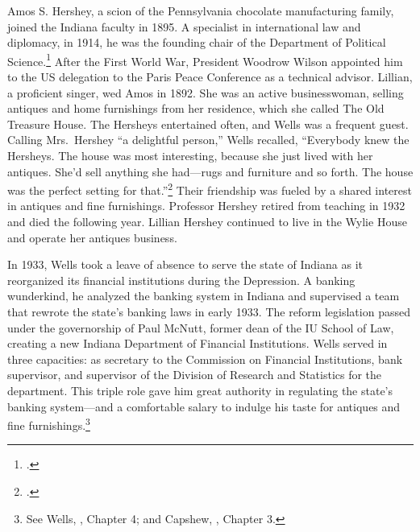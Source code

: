 \documentclass[
  american,
  letterpaper,
]{scrreprt}
\begin{document}
Amos S. Hershey, a scion of the Pennsylvania chocolate manufacturing
family, joined the Indiana faculty in 1895. A specialist in
international law and diplomacy, in 1914, he was the founding chair of
the Department of Political Science.\footnote{.} After the First World War, President
Woodrow Wilson appointed him to the US delegation to the Paris Peace
Conference as a technical advisor. Lillian, a proficient singer, wed
Amos in 1892. She was an active businesswoman, selling antiques and home
furnishings from her residence, which she called The Old Treasure House.
The Hersheys entertained often, and Wells was a frequent guest. Calling
Mrs.~Hershey ``a delightful person,'' Wells recalled, ``Everybody knew
the Hersheys. The house was most interesting, because she just lived
with her antiques. She'd sell anything she had---rugs and furniture and
so forth. The house was the perfect setting for that.''\footnote{.} Their friendship was fueled by a
shared interest in antiques and fine furnishings. Professor Hershey
retired from teaching in 1932 and died the following year. Lillian
Hershey continued to live in the Wylie House and operate her antiques
business.

In 1933, Wells took a leave of absence to serve the state of Indiana as
it reorganized its financial institutions during the Depression. A
banking wunderkind, he analyzed the banking system in Indiana and
supervised a team that rewrote the state's banking laws in early 1933.
The reform legislation passed under the governorship of Paul McNutt,
former dean of the IU School of Law, creating a new Indiana Department
of Financial Institutions. Wells served in three capacities: as
secretary to the Commission on Financial Institutions, bank supervisor,
and supervisor of the Division of Research and Statistics for the
department. This triple role gave him great authority in regulating the
state's banking system---and a comfortable salary to indulge his taste
for antiques and fine furnishings.\footnote{See Wells,
  , Chapter 4; and Capshew,
  , Chapter 3.}
\end{document}
